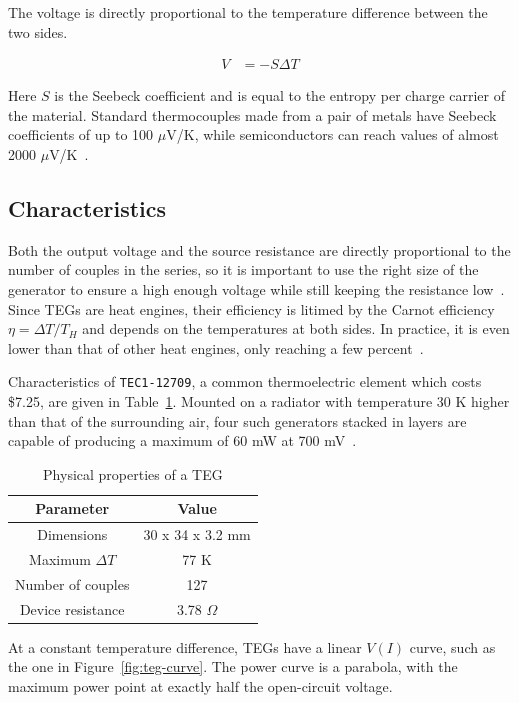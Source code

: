 \documentclass[a4paper,10pt]{article}
\begin{document}
The voltage is directly proportional to the temperature difference between the two sides. 

\begin{align}
 V &= -S \Delta T
\label{eq:seebeck}
\end{align}

Here $S$ is the Seebeck coefficient and is equal to the entropy per charge carrier of the material. Standard thermocouples made from a pair of metals have Seebeck coefficients of up to 100 $\mu$V/K, while semiconductors can reach values of almost 2000 $\mu$V/K~\cite{wiki:thermo,ec:seebeck}. 

\subsection{Characteristics}

Both the output voltage and the source resistance are directly proportional to the number of couples in the series, so it is important to use the right size of the generator to ensure a high enough voltage while still keeping the resistance low~\cite{Salerno10}. Since \acp{TEG} are heat engines, their efficiency is litimed by the Carnot efficiency $\eta = \Delta T / T_H$ and depends on the temperatures at both sides. In practice, it is even lower than that of other heat engines, only reaching a few percent~\cite{teg-curve,wiki:teg}. 

Characteristics of \texttt{TEC1-12709}, a common thermoelectric element which costs \$7.25, are given in Table~\ref{tab:teg-radiator}. Mounted on a radiator with temperature 30 K higher than that of the surrounding air, four such generators stacked in layers are capable of producing a maximum of 60 mW at 700 mV~\cite{teg-wsn-ieee}. 

\begin{table}[h]
  \centering
  \begin{tabular}{|c|c|}
\hline
    Parameter & Value \\
\hline
Dimensions & 30 x 34 x 3.2 mm \\
Maximum $\Delta T$ & 77 K \\
Number of couples & 127 \\
Device resistance & 3.78 $\Omega$ \\
\hline
  \end{tabular}
\caption{Physical properties of a \ac{TEG}}
\label{tab:teg-radiator}
\end{table}

At a constant temperature difference, \acp{TEG} have a linear $V(I)$ curve, such as the one in Figure~\ref{fig:teg-curve}. The power curve is a parabola, with the maximum power point at exactly half the open-circuit voltage. 
\end{document}
